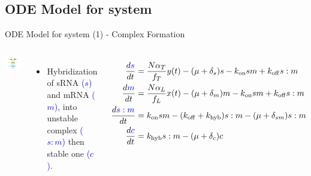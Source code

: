 \documentclass{beamer}
\begin{document}
\subsection{ODE Model for system}
\begin{frame}{ODE Model for system (1) - Complex Formation}{}
\begin{columns}
\includegraphics[trim = 135 0 0 0,clip = true,scale = 0.28]{Figures/schematic_binding}
  \begin{itemize}
    \item  Hybridization of sRNA \textcolor{blue}{($s$)} and mRNA \textcolor{blue}{($m$)}, into unstable complex \textcolor{blue}{($s:m$)} then stable one \textcolor{blue}{($c$)}.
    \end{itemize}
\footnotesize
\begin{align*} 
\frac{d\textcolor{blue}{s}}{dt} &= \frac{N\alpha_{T}}{f_{T}} y(t)-(\mu + \delta_{s})s -k_{\mathrm{on}}sm +k_{\mathrm{off}}s:m \\
\frac{d\textcolor{blue}{m}}{dt} &=  \frac{N\alpha_{L}}{f_{L}}x(t)-(\mu + \delta_{m})m -k_{\mathrm{on}}sm +k_{\mathrm{off}}s:m  \\
\frac{d\textcolor{blue}{s:m}}{dt} & = k_{\mathrm{on}}sm  - (k_{\mathrm{off}}+ k_{\mathrm{hyb}})s:m  -(\mu + \delta_{sm} )s:m \\
\frac{d\textcolor{blue}{c}}{dt} & = k_{\mathrm{hyb}}s:m  -(\mu + \delta_{c})c  \\
\end{align*}
\end{columns}
\end{frame}
\end{document}

